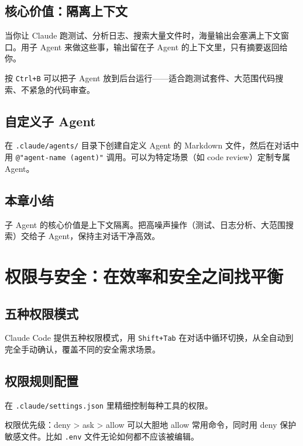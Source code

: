 \documentclass[a4paper]{article}
\begin{document}
\subsection{核心价值：隔离上下文}

当你让 Claude 跑测试、分析日志、搜索大量文件时，海量输出会塞满上下文窗口。用子 Agent 来做这些事，输出留在子 Agent 的上下文里，只有摘要返回给你。

按 \texttt{Ctrl+B} 可以把子 Agent 放到后台运行——适合跑测试套件、大范围代码搜索、不紧急的代码审查。

\subsection{自定义子 Agent}

在 \texttt{.claude/agents/} 目录下创建自定义 Agent 的 Markdown 文件，然后在对话中用 \texttt{@"agent-name (agent)"} 调用。可以为特定场景（如 code review）定制专属 Agent。

\subsection{本章小结}

子 Agent 的核心价值是上下文隔离。把高噪声操作（测试、日志分析、大范围搜索）交给子 Agent，保持主对话干净高效。

\section{权限与安全：在效率和安全之间找平衡}

\subsection{五种权限模式}

Claude Code 提供五种权限模式，用 \texttt{Shift+Tab} 在对话中循环切换，从全自动到完全手动确认，覆盖不同的安全需求场景。

\subsection{权限规则配置}

在 \texttt{.claude/settings.json} 里精细控制每种工具的权限。

\begin{importantbox}{权限优先级：deny > ask > allow}
可以大胆地 allow 常用命令，同时用 deny 保护敏感文件。比如 \texttt{.env} 文件无论如何都不应该被编辑。
\end{importantbox}
\end{document}
